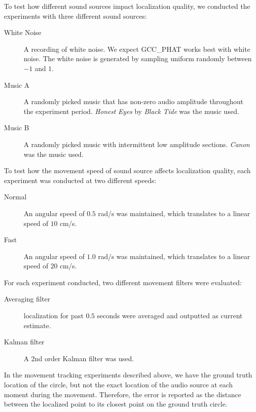 To test how different sound sources impact localization quality, we conducted the experiments with three different sound sources:
\begin{description}%

\item[White Noise] A recording of white noise. We expect GCC\_PHAT works best with white noise. The white noise is generated by sampling uniform randomly between $-1$ and $1$.

\item[Music A] A randomly picked music that has non-zero audio amplitude throughout the experiment period. \emph{Honest Eyes} by \emph{Black Tide} was the music used.

\item[Music B] A randomly picked music with intermittent low amplitude sections. \emph{Canon} was the music used.

\end{description} 

To test how the movement speed of sound source affects localization quality, each experiment was conducted at two different speeds:

\begin{description}
\item[Normal] An angular speed of $0.5$ rad/s was maintained, which translates to a linear speed of $10$ cm/s.
\item[Fast] An angular speed of $1.0$ rad/s was maintained, which translates to a linear speed of $20$ cm/s.
\end{description}

For each experiment conducted, two different movement filters were evaluated:
\begin{description}%
\item[Averaging filter] localization for past $0.5$ seconds were averaged and outputted as current estimate.
\item[Kalman filter] A 2nd order Kalman filter was used.
\end{description}

In the movement tracking experiments described above, we have the ground truth location of the circle, but not the exact location of the audio source at each moment during the movement. Therefore, the error is reported as the distance between the localized point to its closest point on the ground truth circle.
\clearpage

